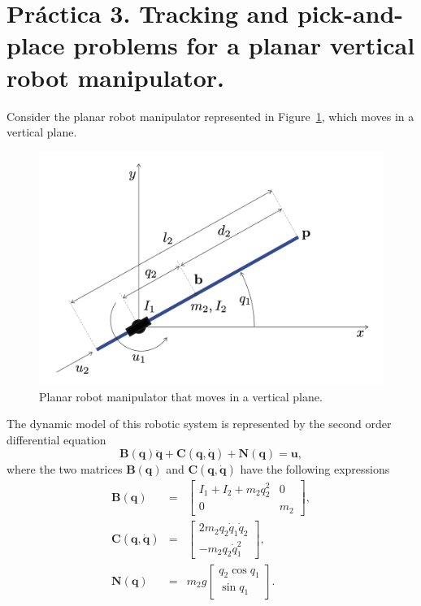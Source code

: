 \documentclass{article}
\begin{document}
\section*{Pr\'actica 3. Tracking and pick-and-place problems for a planar vertical robot manipulator.}

Consider the planar robot manipulator represented in Figure~\ref{fig:figure_1}, which moves in a vertical plane.


\begin{figure}[H]
\centerline{\hspace{0cm}\includegraphics[width=0.66\columnwidth]{figures/drawing.pdf}}
\caption{Planar robot manipulator that moves in a vertical plane.}
\label{fig:figure_1}
\end{figure}


The dynamic model of this robotic system is represented by the
second order differential equation 
\begin{equation*}
\mathbf{B}(\mathbf{q}) \ddot{\mathbf{q}}+ \mathbf{C}(\mathbf{q}, \dot{\mathbf{q}}) + \mathbf{N}(\mathbf{q}) = \mathbf{u},
\end{equation*}
where the two matrices $\mathbf{B}(\mathbf{q})$ and $\mathbf{C}(\mathbf{q}, \dot{\mathbf{q}})$ have the following expressions
\begin{eqnarray*}
\mathbf{B}(\mathbf{q}) &=&
\begin{bmatrix}
I_1 + I_2 + m_2 q_2^2 &0\\
0 & m_2
\end{bmatrix},\\
\mathbf{C}(\mathbf{q}, \dot{\mathbf{q}}) 
&=& 
\begin{bmatrix} 
2 m_2 q_2 \dot{q}_1  \dot{q}_2\\
- m_2 q_2 \dot{q}_1^2
\end{bmatrix},\\
\mathbf{N}(\mathbf{q}) 
&=& 
m_2 g
\begin{bmatrix}
q_2 \cos q_1\\
\sin q_1 
\end{bmatrix}.
\end{eqnarray*}
\end{document}
